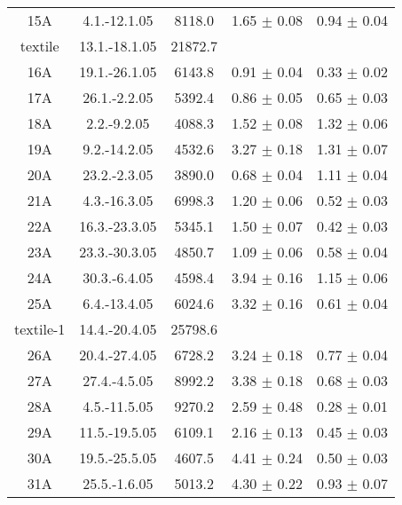 \documentclass[a4paper,12pt]{article}
\begin{document}
\begin{center}
\begin{longtable}{|c|c|c|c|c|}
    15A &       4.1.-12.1.05    &       8118.0  &       1.65 $\pm$ 0.08 &       0.94 $\pm$ 0.04 \\
    textile &   13.1.-18.1.05   &       21872.7 &                       &                       \\
    16A &       19.1.-26.1.05   &       6143.8  &       0.91 $\pm$ 0.04 &       0.33 $\pm$ 0.02 \\
    17A &       26.1.-2.2.05    &       5392.4  &       0.86 $\pm$ 0.05 &       0.65 $\pm$ 0.03 \\
    18A &       2.2.-9.2.05     &       4088.3  &       1.52 $\pm$ 0.08 &       1.32 $\pm$ 0.06 \\
    19A &       9.2.-14.2.05    &       4532.6  &       3.27 $\pm$ 0.18 &       1.31 $\pm$ 0.07 \\
    20A &       23.2.-2.3.05    &       3890.0  &       0.68 $\pm$ 0.04 &       1.11 $\pm$ 0.04 \\
    21A &       4.3.-16.3.05    &       6998.3  &       1.20 $\pm$ 0.06 &       0.52 $\pm$ 0.03 \\
    22A &       16.3.-23.3.05   &       5345.1  &       1.50 $\pm$ 0.07 &       0.42 $\pm$ 0.03 \\
    23A &       23.3.-30.3.05   &       4850.7  &       1.09 $\pm$ 0.06 &       0.58 $\pm$ 0.04 \\
    24A &       30.3.-6.4.05    &       4598.4  &       3.94 $\pm$ 0.16 &       1.15 $\pm$ 0.06 \\
    25A &       6.4.-13.4.05    &       6024.6  &       3.32 $\pm$ 0.16 &       0.61 $\pm$ 0.04 \\
    textile-1 & 14.4.-20.4.05   &       25798.6 &                       &                       \\
    26A &       20.4.-27.4.05   &       6728.2  &       3.24 $\pm$ 0.18 &       0.77 $\pm$ 0.04 \\
    27A &       27.4.-4.5.05    &       8992.2  &       3.38 $\pm$ 0.18 &       0.68 $\pm$ 0.03 \\
    28A &       4.5.-11.5.05    &       9270.2  &       2.59 $\pm$ 0.48 &       0.28 $\pm$ 0.01 \\
    29A &       11.5.-19.5.05   &       6109.1  &       2.16 $\pm$ 0.13 &       0.45 $\pm$ 0.03 \\
    30A &       19.5.-25.5.05   &       4607.5  &       4.41 $\pm$ 0.24 &       0.50 $\pm$ 0.03 \\
    31A &       25.5.-1.6.05    &       5013.2  &       4.30 $\pm$ 0.22 &       0.93 $\pm$ 0.07 \\

\end{longtable}
\end{center}
\end{document}
